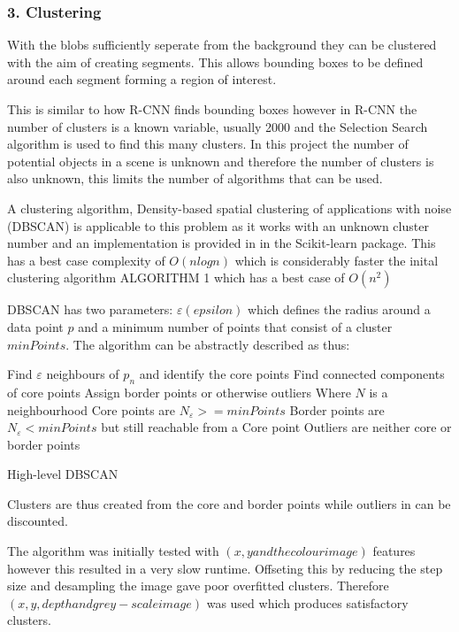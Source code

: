 \documentclass{mproj}
\begin{document}
\subsubsection{3. Clustering}

With the blobs sufficiently seperate from the background they can be clustered with the aim of creating segments. This allows bounding boxes to be defined around each segment forming a region of interest. 

This is similar to how R-CNN finds bounding boxes however in R-CNN the number of clusters is a known variable, usually 2000 and the Selection Search algorithm is used to find this many clusters. In this project the number of potential objects in a scene is unknown and therefore the number of clusters is also unknown, this limits the number of algorithms that can be used.

A clustering algorithm, Density-based spatial clustering of applications with noise (DBSCAN)\cite{dbscan} is applicable to this problem as it works with an unknown cluster number and an implementation is provided in in the Scikit-learn package. This has a best case complexity of $O(n log n)$ which is considerably faster the inital clustering algorithm ALGORITHM 1 which has a best case of $O(n^{2})$


DBSCAN has two parameters: $\varepsilon (epsilon)$ which defines the radius around a data point $p$ and a minimum number of points that consist of a cluster $minPoints$. The algorithm can be abstractly described as thus:

 \begin{algorithm}
    
    Find $\varepsilon$ neighbours of $p_{n}$ and identify the core points\;
    Find connected components of core points\;
    Assign border points or otherwise outliers\;
    Where $N$ is a neighbourhood\;
    Core points are  $N_{\varepsilon} >= minPoints $\;
    Border points are $N_{\varepsilon} < minPoints $ but still reachable from a Core point\;
    Outliers are neither core or border points\;
    
    \caption{High-level DBSCAN  }
\end{algorithm}

Clusters are thus created from the core and border points while outliers in can be discounted.

The algorithm was initially tested with $(x,y and the colour image)$ features however this resulted in a very slow runtime. Offseting this by reducing the step size and desampling the image gave poor overfitted clusters. Therefore $(x, y, depth and grey-scale image)$ was used which produces satisfactory clusters.
\end{document}
